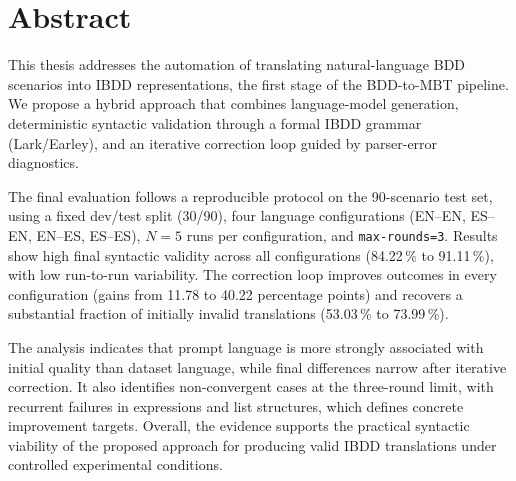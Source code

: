 \chapter*{Abstract}

This thesis addresses the automation of translating natural-language BDD scenarios into IBDD representations, the first stage of the BDD-to-MBT pipeline. We propose a hybrid approach that combines language-model generation, deterministic syntactic validation through a formal IBDD grammar (Lark/Earley), and an iterative correction loop guided by parser-error diagnostics.

The final evaluation follows a reproducible protocol on the 90-scenario test set, using a fixed dev/test split (30/90), four language configurations (EN--EN, ES--EN, EN--ES, ES--ES), $N=5$ runs per configuration, and \texttt{max-rounds=3}. Results show high final syntactic validity across all configurations (84.22\,\% to 91.11\,\%), with low run-to-run variability. The correction loop improves outcomes in every configuration (gains from 11.78 to 40.22 percentage points) and recovers a substantial fraction of initially invalid translations (53.03\,\% to 73.99\,\%).

The analysis indicates that prompt language is more strongly associated with initial quality than dataset language, while final differences narrow after iterative correction. It also identifies non-convergent cases at the three-round limit, with recurrent failures in expressions and list structures, which defines concrete improvement targets. Overall, the evidence supports the practical syntactic viability of the proposed approach for producing valid IBDD translations under controlled experimental conditions.
